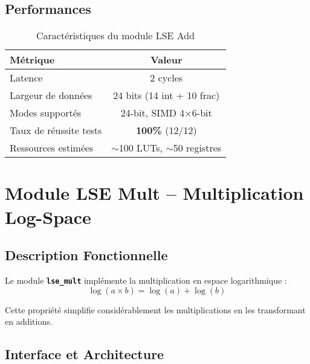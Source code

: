 \documentclass[12pt,a4paper]{article}
\newcommand{\module}[1]{\textbf{\texttt{#1}}}
\begin{document}
\subsection{Performances}

\begin{table}[h]
\centering
\caption{Caractéristiques du module LSE Add}
\begin{tabular}{|l|c|}
\hline
\textbf{Métrique} & \textbf{Valeur} \\
\hline
Latence & 2 cycles \\
Largeur de données & 24 bits (14 int + 10 frac) \\
Modes supportés & 24-bit, SIMD 4×6-bit \\
Taux de réussite tests & \textbf{100\%} (12/12) \\
Ressources estimées & $\sim$100 LUTs, $\sim$50 registres \\
\hline
\end{tabular}
\end{table}

\section{Module LSE Mult -- Multiplication Log-Space}

\subsection{Description Fonctionnelle}

Le module \module{lse\_mult} implémente la multiplication en espace logarithmique :
\begin{equation}
\log(a \times b) = \log(a) + \log(b)
\end{equation}

Cette propriété simplifie considérablement les multiplications en les transformant en additions.

\subsection{Interface et Architecture}
\end{document}
